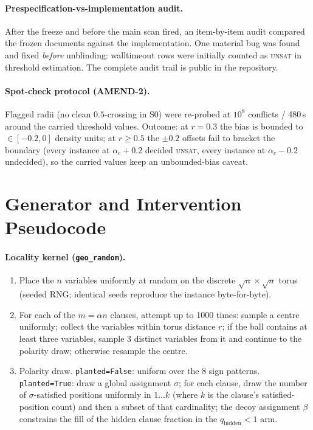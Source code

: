 \documentclass[manuscript, screen, review]{jair}
\begin{document}
\paragraph{Prespecification-vs-implementation audit.}
After the freeze and before the main scan fired, an item-by-item audit
compared the frozen documents against the implementation. One material bug
was found and fixed \emph{before} unblinding: walltimeout rows were initially
counted as \textsc{unsat} in threshold estimation. The complete audit trail
is public in the repository.

\paragraph{Spot-check protocol (AMEND-2).}
Flagged radii (no clean $0.5$-crossing in S0) were re-probed at $10^8$
conflicts / 480\,s around the carried threshold values. Outcome: at $r=0.3$
the bias is bounded to $\in[-0.2,0]$ density units; at $r\ge0.5$ the
$\pm0.2$ offsets fail to bracket the boundary (every instance at
$\alpha_c+0.2$ decided \textsc{unsat}, every instance at $\alpha_c-0.2$
undecided), so the carried values keep an unbounded-bias caveat.

\section{Generator and Intervention Pseudocode}
\label{app:pseudo}

\paragraph{Locality kernel (\texttt{geo\_random}).}
\begin{enumerate}
    \item Place the $n$ variables uniformly at random on the discrete
    $\sqrt{n} \times \sqrt{n}$ torus (seeded RNG; identical seeds reproduce
    the instance byte-for-byte).
    \item For each of the $m = \alpha n$ clauses, attempt up to 1000 times:
    sample a centre uniformly; collect the variables within torus distance
    $r$; if the ball contains at least three variables, sample 3 distinct
    variables from it and continue to the polarity draw; otherwise resample
    the centre.
    \item Polarity draw. \texttt{planted=False}: uniform over the 8 sign
    patterns. \texttt{planted=True}: draw a global assignment $\sigma$; for
    each clause, draw the number of $\sigma$-satisfied positions uniformly
    in $1\ldots k$ (where $k$ is the clause's satisfied-position count) and
    then a subset of that cardinality; the decoy assignment $\beta$
    constrains the fill of the hidden clause fraction in the
    $q_{\text{hidden}}<1$ arm.
\end{enumerate}
\end{document}
